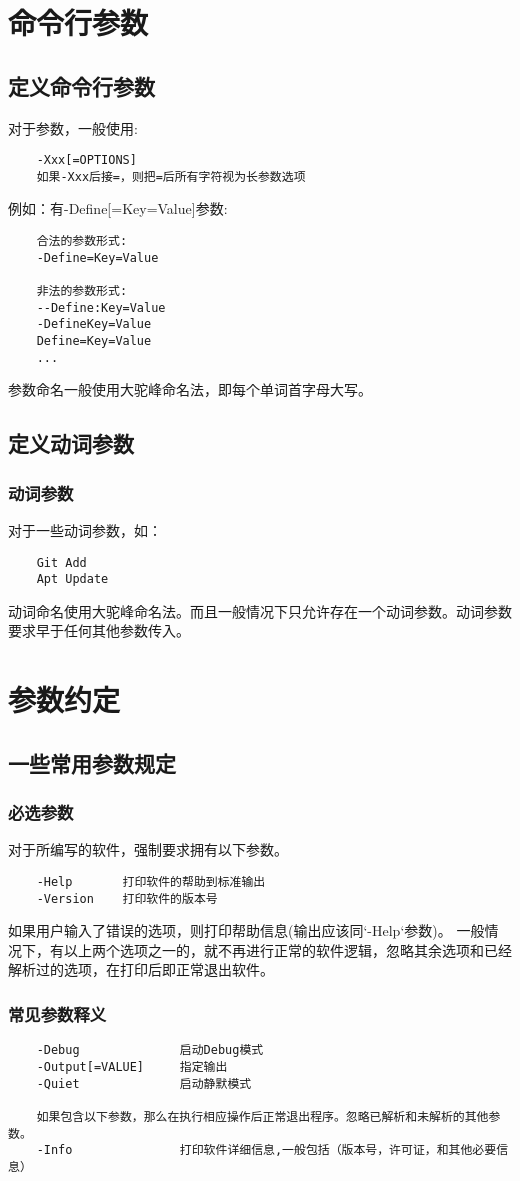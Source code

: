 \chapter{命令行参数}
\section{定义命令行参数}

对于参数，一般使用:
\begin{lstlisting}
	-Xxx[=OPTIONS]
	如果-Xxx后接=，则把=后所有字符视为长参数选项	
\end{lstlisting}

例如：有-Define[=Key=Value]参数:
\begin{lstlisting}
	合法的参数形式:
	-Define=Key=Value
	
	非法的参数形式:
	--Define:Key=Value
	-DefineKey=Value
	Define=Key=Value
	...
\end{lstlisting}
参数命名一般使用大驼峰命名法，即每个单词首字母大写。



\section{定义动词参数}
\subsection{动词参数}
对于一些动词参数，如：
\begin{lstlisting}
	Git Add
	Apt Update
\end{lstlisting}
动词命名使用大驼峰命名法。而且一般情况下只允许存在一个动词参数。动词参数要求早于任何其他参数传入。


\chapter{参数约定}

\section{一些常用参数规定}

\subsection{必选参数}

对于所编写的软件，强制要求拥有以下参数。
\label{_PARAM_HELP_RULE_}
\begin{lstlisting}
	-Help 		打印软件的帮助到标准输出
	-Version 	打印软件的版本号
\end{lstlisting}
如果用户输入了错误的选项，则打印帮助信息(输出应该同`-Help`参数)。
一般情况下，有以上两个选项之一的，就不再进行正常的软件逻辑，忽略其余选项和已经解析过的选项，在打印后即正常退出软件。


\subsection{常见参数释义}
\begin{lstlisting}
	-Debug				启动Debug模式
	-Output[=VALUE]		指定输出
	-Quiet				启动静默模式
	
	如果包含以下参数，那么在执行相应操作后正常退出程序。忽略已解析和未解析的其他参数。
	-Info 				打印软件详细信息,一般包括（版本号，许可证，和其他必要信息）
\end{lstlisting}


